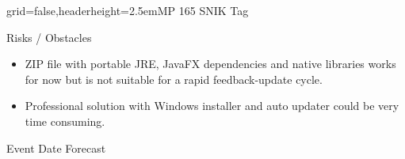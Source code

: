 \documentclass[english]{kiesgrube}
\begin{document}
\begin{poster}{grid=false,headerheight=2.5em}{}{MP 165 SNIK Tag}{}{}
\begin{posterbox}[name=risks,column=1,below=open]{Risks / Obstacles}
\begin{itemize}
\item ZIP file with portable JRE, JavaFX dependencies and native libraries works for now but is not suitable for a rapid feedback-update cycle.
\item Professional solution with Windows installer and auto updater could be very time consuming. 
\end{itemize}
\end{posterbox}
\begin{posterbox}[name=event,column=0,below=progress]{Event Date Forecast}
\begin{tabulary}{\textwidth}{lL}
\end{tabulary}
\end{posterbox}
\footer{}
\end{poster}

\newpage
\end{document}
